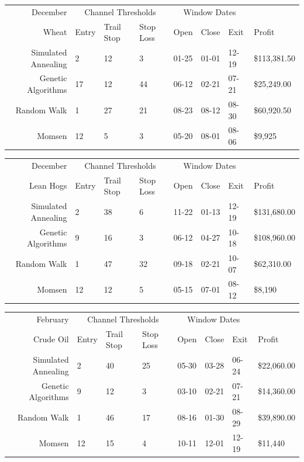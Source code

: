 \documentclass[12pt]{article}
\begin{document}
\begin{tabular}{|r|l|l|l|l|l|l|l|}
  \hline
  December & \multicolumn{3}{|c|}{Channel Thresholds} & \multicolumn{3}{|c|}{Window Dates} &  \\
  Wheat & Entry & Trail Stop & Stop Loss & Open & Close & Exit & Profit\\ \hline
  Simulated Annealing & 2 & 12 & 3 & 01-25 & 01-01 & 12-19 & \$113,381.50 \\ \hline
  Genetic Algorithms & 17 & 12 & 44 & 06-12 & 02-21 & 07-21 & \$25,249.00 \\ \hline
  Random Walk & 1 & 27 & 21 & 08-23 & 08-12 & 08-30 & \$60,920.50 \\ \hline
  Momsen & 12 & 5 & 3 & 05-20 & 08-01 & 08-06 & \$9,925 \\ \hline
\end{tabular}

\begin{tabular}{|r|l|l|l|l|l|l|l|}
  \hline
  December  & \multicolumn{3}{|c|}{Channel Thresholds} & \multicolumn{3}{|c|}{Window Dates} &  \\
  Lean Hogs & Entry & Trail Stop & Stop Loss & Open & Close & Exit & Profit\\ \hline
  Simulated Annealing & 2 & 38 & 6 & 11-22 & 01-13 & 12-19 & \$131,680.00 \\ \hline
  Genetic Algorithms & 9 & 16 & 3 & 06-12 & 04-27 & 10-18 & \$108,960.00 \\ \hline
  Random Walk & 1 & 47 & 32 & 09-18 & 02-21 & 10-07 & \$62,310.00 \\ \hline
  Momsen & 12 & 12 & 5 & 05-15 & 07-01 & 08-12 & \$8,190 \\ \hline
\end{tabular}

\begin{tabular}{|r|l|l|l|l|l|l|l|}
  \hline
  February & \multicolumn{3}{|c|}{Channel Thresholds} & \multicolumn{3}{|c|}{Window Dates} &  \\
  Crude Oil & Entry & Trail Stop & Stop Loss & Open & Close & Exit & Profit\\ \hline
  Simulated Annealing & 2 & 40 & 25 & 05-30 & 03-28 & 06-24 & \$22,060.00 \\ \hline
  Genetic Algorithms & 9 & 12 & 3 & 03-10 & 02-21 & 07-21 & \$14,360.00 \\ \hline
  Random Walk & 1 & 46 & 17 & 08-16 & 01-30 & 08-29 & \$39,890.00 \\ \hline
  Momsen & 12 & 15 & 4 & 10-11 & 12-01 & 12-19 & \$11,440 \\ \hline
\end{tabular}
\end{document}

